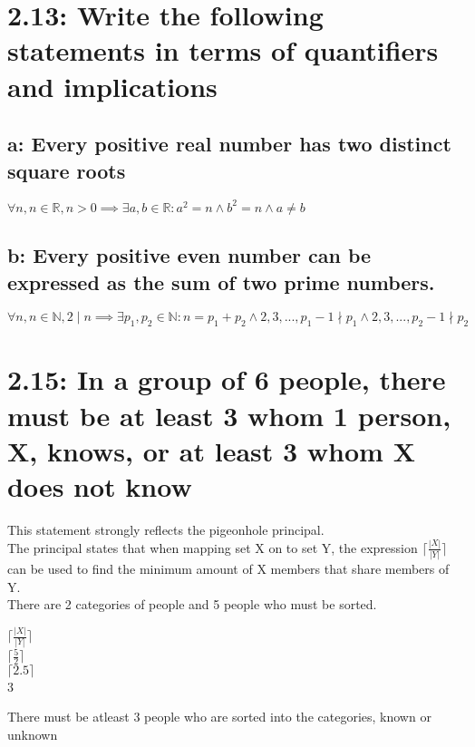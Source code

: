 \documentclass{article}
\begin{document}
\section*{2.13: Write the following statements in terms of quantifiers and implications}
\subsection*{a: Every positive real number has two distinct square roots}
$\forall n, n \in \mathbb{R}, n > 0 \implies \exists a, b \in \mathbb{R}: a^2 = n \land b^2 = n \land a \neq b$
\subsection*{b: Every positive even number can be expressed as the sum of two prime numbers.}
$\forall n, n \in \mathbb{N}, 2 \mid n \implies \exists p_1, p_2 \in \mathbb{N}: n = p_1 + p_2 \land 2, 3, ..., p_1-1 \nmid p_1 \land 2, 3, ..., p_2-1 \nmid p_2$
\section*{2.15: In a group of 6 people, there must be at least 3 whom 1 person, X, knows, or at least 3 whom X does not know}
This statement strongly reflects the pigeonhole principal. \\
The principal states that when mapping set X on to set Y, the expression $\lceil \frac{|X|}{|Y|} \rceil$ can be used to find the minimum amount of X members that share members of Y. \\
There are 2 categories of people and 5 people who must be sorted. \\
\begin{center}
  $\lceil \frac{|X|}{|Y|} \rceil$ \\
  $\lceil \frac{5}{2} \rceil$ \\
  $\lceil 2.5 \rceil$ \\
  3
\end{center}
There must be atleast 3 people who are sorted into the categories, known or unknown
\end{document}
